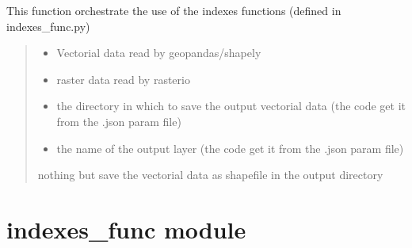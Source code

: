 \documentclass[letterpaper,10pt,english]{article}
\begin{document}
\begin{fulllineitems}
\label{\detokenize{compute_indexes:compute_indexes.compute_indexes_}}
\pysigstartsignatures
{}
\pysigstopsignatures
\sphinxAtStartPar
This function orchestrate the use of the indexes functions (defined in indexes\_func.py)
\begin{quote}\begin{description}
\begin{itemize}
\item {} 
\sphinxAtStartPar
{} \textendash{} Vectorial data read by geopandas/shapely

\item {} 
\sphinxAtStartPar
{} \textendash{} raster data read by rasterio

\item {} 
\sphinxAtStartPar
{} \textendash{} the directory in which to save the output vectorial data (the code get it from the .json param file)

\item {} 
\sphinxAtStartPar
{} \textendash{} the name of the output layer (the code get it from the .json param file)

\end{itemize}

\sphinxAtStartPar
nothing but save the vectorial data as shapefile in the output directory

\end{description}\end{quote}

\end{fulllineitems}


\sphinxstepscope


\section{indexes\_func module}
\label{\detokenize{indexes_func:module-indexes_func}}\label{\detokenize{indexes_func:indexes-func-module}}\label{\detokenize{indexes_func::doc}}
\end{document}
